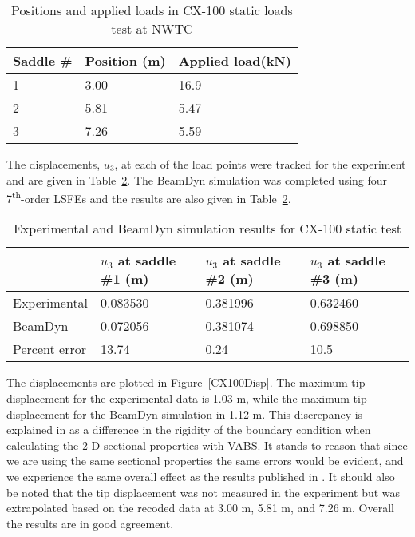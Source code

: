 \documentclass{aiaa-tc}
\begin{document}
\begin{table} 
\caption{\label{CX100Load}Positions and applied loads in CX-100 static loads test at NWTC  } 
\begin{center}
    \begin{tabular}{| l | l |l |}
    	\hline
    	 Saddle \# &     Position (m) & Applied load(kN)  \\ \hline
    1&	3.00 & 16.9         \\  \hline
    2&	5.81   & 5.47         \\ \hline
    3&	    	7.26   & 5.59         \\ \hline
    \end{tabular}
\end{center}
\end{table}

The displacements, $u_3$, at each of the load points were tracked for the experiment and are given in Table~\ref{CX100Results}. The BeamDyn simulation was completed using four 7\textsuperscript{th}-order LSFEs and the results are also given in Table~\ref{CX100Results}.

\begin{table}
\caption{\label{CX100Results}Experimental and BeamDyn simulation results for CX-100 static test  } 
\begin{center}
    \begin{tabular}{| l | l | l | l |}
    	\hline
    	             & $u_3$ at saddle \#1 (m) & $u_3$ at saddle \#2 (m) & $u_3$ at saddle \#3 (m) \\ \hline
    	Experimental & 0.083530             & 0.381996               & 0.632460             \\ \hline
    	BeamDyn      & 0.072056               & 0.381074                & 0.698850           \\ \hline
    	    	Percent error      &        13.74        & 0.24                & 10.5           \\ \hline
    \end{tabular}
\end{center}
\end{table} 
The displacements are plotted in Figure~\ref{CX100Disp}. The maximum tip displacement for the experimental data is 1.03 m, while the maximum tip displacement for the BeamDyn simulation in 1.12 m. This discrepancy is explained in \cite{Luscher:2013} as a difference in the rigidity of the boundary condition when calculating the 2-D sectional properties with VABS. It stands to reason that since we are using the same sectional properties the same errors would be evident, and we experience the same overall effect as the results published in \cite{Luscher:2013}. It should also be noted that the tip displacement was not measured in the experiment but was extrapolated based on the recoded data at 3.00 m, 5.81 m, and 7.26 m. Overall the results are in good agreement.
\end{document}
